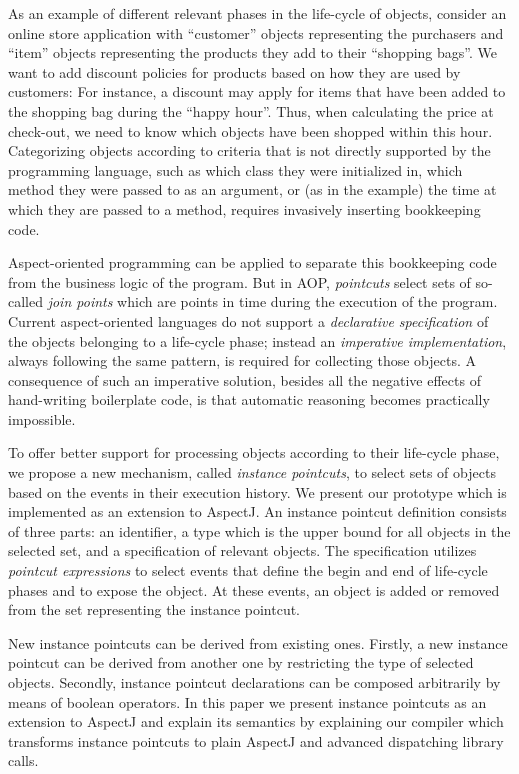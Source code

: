 As an example of different relevant phases in the life-cycle of objects, consider an online store application with ``customer'' objects representing the purchasers and ``item'' objects representing the products they add to their ``shopping bags''. 
We want to add discount policies for products based on how they are used by customers: 
For instance, a discount may apply for items that have been added to the shopping bag during the ``happy hour''. Thus, when calculating the price at check-out, we need to know which objects have been shopped within this hour.
Categorizing objects according to criteria that is not directly supported by the programming language, such as which class they were initialized in, which method they were passed to as an argument, or (as in the example) the time at which they are passed to a method, requires invasively inserting bookkeeping code.

Aspect-oriented programming can be applied to separate this bookkeeping code from the business logic of the program. But in AOP, \emph{pointcuts} select sets of so-called \emph{join points} which are points in time during the execution of the program. Current aspect-oriented languages do not support a \emph{declarative specification} of the objects belonging to a life-cycle phase; instead an \emph{imperative implementation}, always following the same pattern, is required for collecting those objects.
A consequence of such an imperative solution, besides all the negative effects of hand-writing boilerplate code, is that automatic reasoning becomes practically impossible. 

To offer better support for processing objects according to their life-cycle phase, we propose a new mechanism, called \emph{instance pointcuts}, to select sets of objects based on the events in their execution history.
We present our prototype which is implemented as an extension to AspectJ.
An instance pointcut definition consists of three parts: an identifier, a type which is the upper bound for all objects in the selected set, and a specification of relevant objects.
The specification utilizes \emph{pointcut expressions} to select events that define the begin and end of life-cycle phases and to expose the object. At these events, an object is added or removed from the set representing the instance pointcut.

New instance pointcuts can be derived from existing ones. Firstly, a new instance pointcut can be derived from another one by restricting the type of selected objects. 
Secondly, instance pointcut declarations can be composed arbitrarily by means of boolean operators. In this paper we present instance pointcuts as an extension to AspectJ \cite{kiczales2001overview} and explain its semantics by explaining our compiler which transforms instance pointcuts to plain AspectJ and advanced dispatching library calls. 


